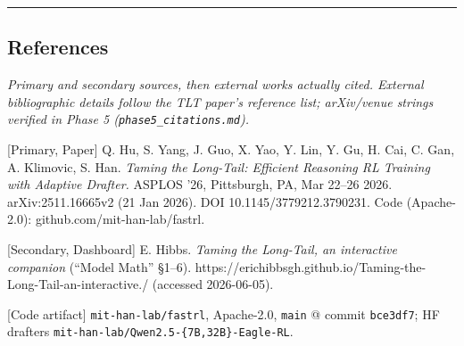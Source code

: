 \documentclass[
  11pt,
  letterpaper,
]{article}
\begin{document}
\begin{center}\rule{0.5\linewidth}{0.5pt}\end{center}

\subsection*{References}\label{references}

\emph{Primary and secondary sources, then external works actually cited.
External bibliographic details follow the TLT paper's reference list;
arXiv/venue strings verified in Phase 5
(\texttt{phase5\_citations.md}).}

{[}Primary, Paper{]} Q. Hu, S. Yang, J. Guo, X. Yao, Y. Lin, Y. Gu, H.
Cai, C. Gan, A. Klimovic, S. Han. \emph{Taming the Long-Tail: Efficient
Reasoning RL Training with Adaptive Drafter.} ASPLOS '26, Pittsburgh,
PA, Mar 22--26 2026. arXiv:2511.16665v2 (21 Jan 2026). DOI
10.1145/3779212.3790231. Code (Apache-2.0):
github.com/mit-han-lab/fastrl.

{[}Secondary, Dashboard{]} E. Hibbs. \emph{Taming the Long-Tail, an
interactive companion} (``Model Math'' §1--6).
https://erichibbsgh.github.io/Taming-the-Long-Tail-an-interactive./
(accessed 2026-06-05).

{[}Code artifact{]} \texttt{mit-han-lab/fastrl}, Apache-2.0,
\texttt{main} @ commit \texttt{bce3df7}; HF drafters
\texttt{mit-han-lab/Qwen2.5-\{7B,32B\}-Eagle-RL}.
\end{document}

